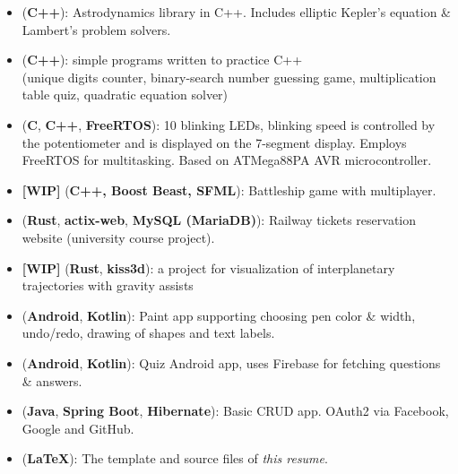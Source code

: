 \documentclass{resume}
\begin{document}
\begin{itemize}
	\item {}
		(\textbf{C++}):
		Astrodynamics library in C++. Includes elliptic Kepler's equation \& Lambert's problem solvers.
	\item {}
		(\textbf{C++}):
		simple programs written to practice C++\\
		(unique digits counter, binary-search number guessing game, multiplication table quiz, quadratic equation solver)
	\item {}
		(\textbf{C}, \textbf{C++}, \textbf{FreeRTOS}):
		10 blinking LEDs, blinking speed is controlled by the potentiometer and is displayed on the 7-segment display. Employs FreeRTOS for multitasking. Based on ATMega88PA AVR microcontroller.
	\item {}
		\textbf{[WIP]} (\textbf{C++, Boost Beast, SFML}):
		Battleship game with multiplayer.
	\item {}
		(\textbf{Rust}, \textbf{actix-web}, \textbf{MySQL (MariaDB)}):
		Railway tickets reservation website (university course project).
	\item {}
		\textbf{[WIP]} (\textbf{Rust}, \textbf{kiss3d}):
		a project for visualization of interplanetary trajectories with gravity assists
	\item {}
		(\textbf{Android}, \textbf{Kotlin}):
		Paint app supporting choosing pen color \& width, undo/redo, drawing of shapes and text labels.
	\item {}
		(\textbf{Android}, \textbf{Kotlin}):
		Quiz Android app, uses Firebase for fetching questions \& answers.
	\item {}
		(\textbf{Java}, \textbf{Spring Boot}, \textbf{Hibernate}):
		Basic CRUD app. OAuth2 via Facebook, Google and GitHub.
	\item {}
		(\textbf{\LaTeX}):
		The template and source files of \emph{this resume}.
\end{itemize}
\end{document}
